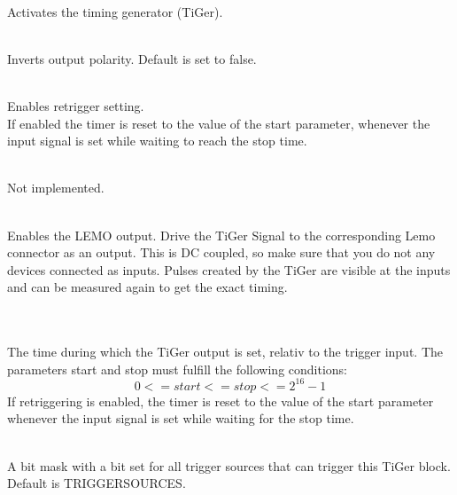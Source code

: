 			\\
			Activates the timing generator (TiGer).\par
	
			\\
			Inverts output polarity. Default is set to false.\par
	
			\\
			Enables retrigger setting.\\
			If enabled the timer is reset to the value of the \textsf{start} parameter, whenever the input signal is set while waiting to reach the \textsf{stop} time.\par
	
			\\
			Not implemented.
	
			\\
			Enables the LEMO output. Drive the TiGer Signal to the corresponding Lemo connector as an output. 
			This is DC coupled, so make sure that you do not any devices connected as inputs.
			Pulses created by the TiGer are visible at the \deviceName inputs and can be measured again to get the exact timing.  
	
			\\
			\\
			The time during which the TiGer output is set, relativ to the trigger input. The parameters \textsf{start} and \textsf{stop} must fulfill the following conditions:
			\[ 0 <= start <= stop <= 2^{16}-1 \]
			If retriggering is enabled, the timer is reset to the value of the start parameter whenever the input signal is set while waiting for the stop time. \par
			
	
			\\
			A bit mask with a bit set for all trigger sources that can trigger this TiGer block. 
			Default is \textsf{\PREFIX TRIGGER\tu SOURCE\tu S}.\par
	

